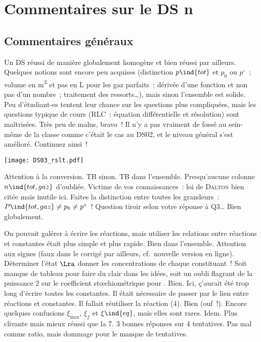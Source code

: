 \documentclass[a4paper, 10pt, final, garamond]{book}
\begin{document}
\setcounter{chapter}{2}

\chapter{Commentaires sur le DS n}

\section{Commentaires généraux}
Un DS réussi de manière globalement homogène et bien réussi par ailleurs.
Quelques notions sont encore peu acquises (distinction $p\ind{tot}$ et $p_0$ ou
$p^\circ$~; volume en \si{m^3} et pas en \si{L} pour les gaz parfaits~; dérivée
d'une fonction et non pas d'un nombre~; traitement des ressorts…), mais sinon
l'ensemble est solide. Peu d'étudiant-es tentent leur chance sur les questions
plus compliquées, mais les questions typique de cours (RLC~: équation
différentielle et résolution) sont maîtrisées. Très peu de malus, bravo~! Il n'y
a pas vraiment de fossé au sein-même de la classe comme c'était le cas au DS02,
et le niveau général s'est amélioré. Continuez ainsi~!

\begin{center}
	\texttt{[image: DS03\_rslt.pdf]}
\end{center}

\setcounter{section}{0}
\begin{enumerate}
	 Attention à la conversion. TB sinon.
	 TB dans l'ensemble. Presqu'aucune colonne $n\ind{tot, gaz}$
	d'oubliée.
	 Victime de vos connaissances~: loi de \textsc{Dalton} bien citée
	mais inutile ici. Faites la distinction entre toutes les grandeurs~:
	$P\ind{tot, gaz} \neq p_0 \neq p^\circ$~!
	 Question tiroir selon votre réponse à Q3…
	 Bien globalement.
\end{enumerate}

\begin{enumerate}
	 On pouvait galérer à écrire les réactions, mais utiliser les
	relations entre réactions et constantes était plus simple et plus rapide.
	 Bien dans l'ensemble. Attention aux signes (faux dans le corrigé
	par ailleurs, cf.\ nouvelle version en ligne). Déterminer l'état $\Lra$ donner
	les concentrations de chaque constituant~!
	 Soit manque de tableau pour faire du clair dans les idées, soit un
	oubli flagrant de la puissance 2 sur le coefficient stœchiométrique pour
	.
	 Bien.
	 Ici, ç'aurait été trop long d'écrire toutes les constantes. Il était
	nécessaire de passer par le lien entre réactions et constantes. Il fallait
	réutiliser la réaction (4).
	 Bien (ouf~!).
	 Encore quelques confusions $\xi_{\max}$, $\xi_f$ et $\xi\ind{eq}$,
	mais elles sont rares.
	 Idem. Plus clivante mais mieux réussi que la 7.
	 3 bonnes réponses sur 4 tentatives. Pas mal comme ratio, mais
	dommage pour le manque de tentatives.
\end{enumerate}
\end{document}
